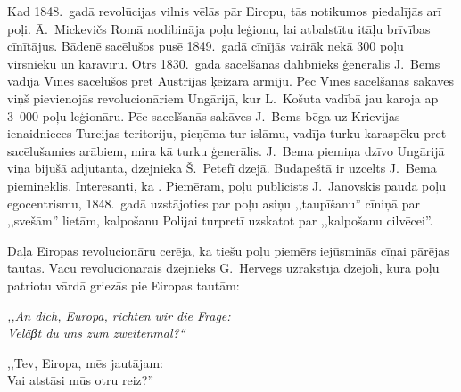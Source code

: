 \documentclass[twoside,a5paper,12pt,fleqn,openany]{extbook}
\newcommand{\detxti}[1]{\textit{\textgerman{#1}}}
\begin{document}
Kad 1848.~gadā revolūcijas vilnis vēlās pār Eiropu, tās notikumos piedalījās arī poļi. Ā.~Mickevičs Romā nodibināja poļu leģionu, lai atbalstītu itāļu brīvības cīnītājus. Bādenē sacēlušos pusē 1849.~gadā cīnījās vairāk nekā 300 poļu virsnieku un karavīru. Otrs 1830.~gada sacelšanās dalībnieks ģenerālis J.~Bems vadīja Vīnes sacēlušos pret Austrijas ķeizara armiju. Pēc Vīnes sacelšanās sakāves viņš pievienojās revolucionāriem Ungārijā, kur L.~Košuta vadībā jau karoja ap 3~000 poļu leģionāru. Pēc sacelšanās sakāves J.~Bems bēga uz Krievijas ienaidnieces Turcijas teritoriju, pieņēma tur islāmu, vadīja turku karaspēku pret sacēlušamies arābiem, mira kā turku ģenerālis. J.~Bema piemiņa dzīvo Ungārijā viņa bijušā adjutanta, dzejnieka Š.~Petefī dzejā. Budapeštā ir uzcelts J.~Bema piemineklis. Interesanti, ka . Piemēram, poļu publicists J.~Janovskis pauda poļu egocentrismu, 1848.~gadā uzstājoties par poļu asiņu ,,taupīšanu'' cīniņā par ,,svešām'' lietām, kalpošanu Polijai turpretī uzskatot par ,,kalpošanu cilvēcei''.

Daļa Eiropas revolucionāru cerēja, ka tiešu poļu piemērs iejūsminās cīņai pārējas tautas. Vācu revolucionārais dzejnieks G.~Hervegs uzrakstīja dzejoli, kurā poļu patriotu vārdā griezās pie Eiropas tautām:

\vspace{1.5em}

\noindent
\begin{minipage}{0.6\textwidth}
\detxti{
,,An dich, Europa, richten wir die Frage:\\
Veläβt du uns zum zweitenmal?“}
\end{minipage}
\hspace{1em}
\begin{minipage}{0.45\textwidth}
,,Tev, Eiropa, mēs jautājam:\\
Vai atstāsi mūs otru reiz?''
\end{minipage}

\vspace{1.5em}

\end{document}
